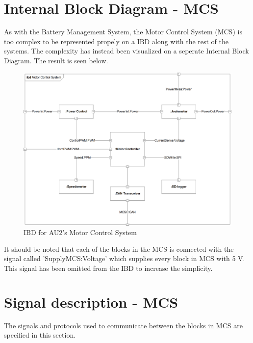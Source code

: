 \section{Internal Block Diagram - MCS}
As with the Battery Management System, the Motor Control System (MCS) is too complex to be represented propely on a IBD along with the rest of the systems. The complexity has instead been visualized on a seperate Internal Block Diagram. The result is seen below.
\begin{figure}[H]
	\centering
	\includegraphics[width=1\linewidth]{Architecture/Diagrams/IBD_MCS}
	\caption{IBD for AU2's Motor Control System}
	\label{fig:IBD_MCS}
\end{figure}

It should be noted that each of the blocks in the MCS is connected with the signal called 'SupplyMCS:Voltage' which supplies every block in MCS with 5 V. This signal has been omitted from the IBD to increase the simplicity.

\section{Signal description - MCS}
The signals and protocols used to communicate between the blocks in MCS are specified in this section.

